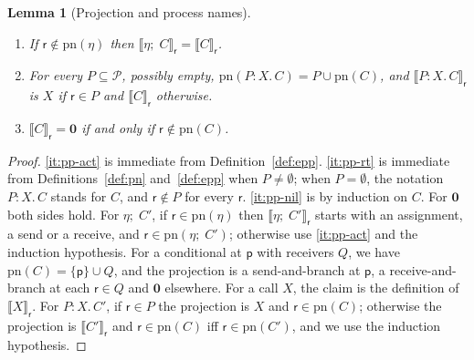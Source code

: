 \documentclass[11pt]{article}
\theoremstyle{plain}
\newtheorem{lemma}[theorem]{Lemma}
\theoremstyle{definition}
\theoremstyle{remark}
\newcommand{\nil}{\mathbf{0}}
\newcommand{\seq}{;\;}
\newcommand{\pp}{\mathsf{p}}
\newcommand{\rr}{\mathsf{r}}
\newcommand{\Procs}{\mathcal{P}}
\newcommand{\pn}{\mathrm{pn}}
\newcommand{\proj}[2]{\llbracket #1 \rrbracket_{#2}}
\newcommand{\rt}[3]{#1\mathbin{:}#2.\,#3}
\begin{document}
\begin{lemma}[Projection and process names]\label{lem:proj-prefix}
  \begin{enumerate}[label=(\roman*),nosep]
  \item\label{it:pp-act} If $\rr\notin\pn(\eta)$ then $\proj{\eta\seq C}{\rr} = \proj{C}{\rr}$.
  \item\label{it:pp-rt} For every $P\subseteq\Procs$, possibly empty,
    $\pn(\rt{P}{X}{C}) = P\cup\pn(C)$, and $\proj{\rt{P}{X}{C}}{\rr}$ is $X$
    if $\rr\in P$ and $\proj{C}{\rr}$ otherwise.
  \item\label{it:pp-nil} $\proj{C}{\rr} = \nil$ if and only if $\rr\notin\pn(C)$.
  \end{enumerate}
\end{lemma}
\begin{proof}
  \ref{it:pp-act} is immediate from Definition~\ref{def:epp}.
  \ref{it:pp-rt} is immediate from Definitions~\ref{def:pn}
  and~\ref{def:epp} when $P\neq\emptyset$; when $P=\emptyset$, the notation
  $\rt{P}{X}{C}$ stands for $C$, and $\rr\notin P$ for every $\rr$.
  \ref{it:pp-nil} is by induction on $C$.  For $\nil$ both sides hold.  For
  $\eta\seq C'$, if $\rr\in\pn(\eta)$ then $\proj{\eta\seq C'}{\rr}$ starts
  with an assignment, a send or a receive, and $\rr\in\pn(\eta\seq C')$;
  otherwise use \ref{it:pp-act} and the induction hypothesis.  For a
  conditional at $\pp$ with receivers $Q$, we have $\pn(C) = \{\pp\}\cup Q$,
  and the projection is a send-and-branch at $\pp$, a receive-and-branch at
  each $\rr\in Q$ and $\nil$ elsewhere.  For a call $X$, the claim is the
  definition of $\proj{X}{\rr}$.  For $\rt{P}{X}{C'}$, if $\rr\in P$ the
  projection is $X$ and $\rr\in\pn(C)$; otherwise the projection is
  $\proj{C'}{\rr}$ and $\rr\in\pn(C)$ iff $\rr\in\pn(C')$, and we use the
  induction hypothesis.
\end{proof}
\end{document}
